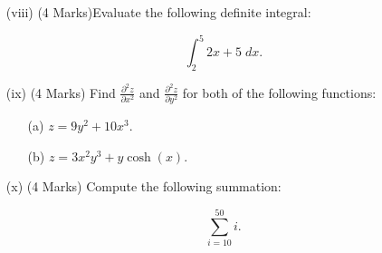 ﻿ \documentclass[a4paper,12pt]{article}
\begin{document}
\begin{itemize}
\begin{multicols}{2}
\begin{itemize}
	\end{itemize}
	\end{multicols}

	\smallskip
	\item[(viii)] (4 Marks)Evaluate the following definite integral:
	
	\[  \int^{5}_{2}  2x+5\; dx.  \]
	\smallskip

	
%	
	
	
	\item[(ix)] (4 Marks) Find $\displaystyle{ \frac{ \partial^2 z }{ \partial x^2 }}$ and $\displaystyle{ \frac{ \partial^2 z }{ \partial y^2 }}$  for both of the following functions:
\smallskip
	\begin{multicols}{2}
		\begin{itemize}
			\item[(a)] $\displaystyle{  z = 9y^2 +10x^3. }  $
				\item[(b)] $\displaystyle{  z = 3x^2y^3 + y\cosh(x).}$
				
			\end{itemize}
		\end{multicols}
		\medskip
	\item[(x)] (4 Marks)  Compute the following summation:
	
	\[ \sum_{i=10}^{50} i . \]
\end{itemize}





	

	
%		
%
%
%		
%
\end{document}

